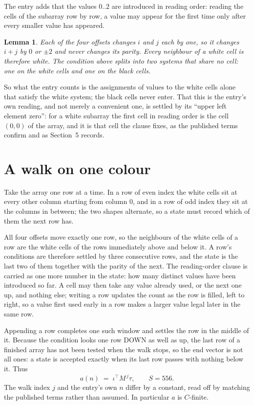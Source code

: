 \documentclass[11pt,a4paper]{article}
\theoremstyle{plain}
\newtheorem{lemma}[theorem]{Lemma}
\theoremstyle{definition}
\begin{document}
The entry adds that the values $0..2$ are introduced in reading order: reading the cells of the subarray row by row, a value may appear for the first time only after every smaller value has appeared.

\begin{lemma}\label{lem:split}
Each of the four offsets changes $i$ and $j$ each by one, so it changes $i+j$ by $0$ or $\pm2$
and never changes its parity. Every neighbour of a white cell is therefore white. The condition
above splits into two systems that share no cell: one on the white cells and one on the black
cells.
\end{lemma}

So what the entry counts is the assignments of values to the white cells alone that satisfy the
white system; the black cells never enter. That this is the entry's own reading, and not
merely a convenient one, is settled by its ``upper left element zero'': for a white subarray the
first cell in reading order is the cell $(0,0)$ of the array, and it is that cell the
clause fixes, as the published terms confirm and as Section~5 records.

\section{A walk on one colour}

Take the array one row at a time. In a row of even index the white cells sit at every other
column starting from column $0$, and in a row of odd index they sit at the columns in
between; the two shapes alternate, so a state must record which of them the next row has.

All four offsets move exactly one row, so the neighbours of the white cells of a row are the
white cells of the rows immediately above and below it. A row's conditions are therefore settled
by three consecutive rows, and the state is the last two of them together with the parity of the
next.
The reading-order clause is carried as one more number in the state: how many distinct values
have been introduced so far. A cell may then take any value already used, or the next one up,
and nothing else; writing a row updates the count as the row is filled, left to right, so a
value first used early in a row makes a larger value legal later in the same row.


Appending a row completes one such window and settles the row in the middle of it. Because the
condition looks one row DOWN as well as up, the last row of a finished array has not been tested
when the walk stops, so the end vector is not all ones: a state is accepted exactly when its
last row passes with nothing below it. Thus
\[
a(n)\;=\;\iota^{\!\top}M^{\,j}\tau ,\qquad S=556.
\]
The walk index $j$ and the entry's own $n$ differ by a constant, read off by matching the
published terms rather than assumed. In particular $a$ is $C$-finite.
\end{document}
